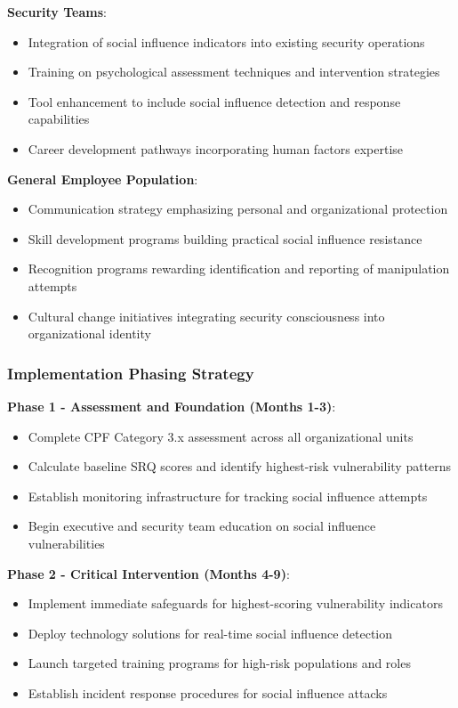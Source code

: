 \documentclass[11pt,a4paper]{article}
\begin{document}
\textbf{Security Teams}:
\begin{itemize}
\item Integration of social influence indicators into existing security operations
\item Training on psychological assessment techniques and intervention strategies
\item Tool enhancement to include social influence detection and response capabilities
\item Career development pathways incorporating human factors expertise
\end{itemize}

\textbf{General Employee Population}:
\begin{itemize}
\item Communication strategy emphasizing personal and organizational protection
\item Skill development programs building practical social influence resistance
\item Recognition programs rewarding identification and reporting of manipulation attempts
\item Cultural change initiatives integrating security consciousness into organizational identity
\end{itemize}

\subsubsection{Implementation Phasing Strategy}

\textbf{Phase 1 - Assessment and Foundation (Months 1-3)}:
\begin{itemize}
\item Complete CPF Category 3.x assessment across all organizational units
\item Calculate baseline SRQ scores and identify highest-risk vulnerability patterns
\item Establish monitoring infrastructure for tracking social influence attempts
\item Begin executive and security team education on social influence vulnerabilities
\end{itemize}

\textbf{Phase 2 - Critical Intervention (Months 4-9)}:
\begin{itemize}
\item Implement immediate safeguards for highest-scoring vulnerability indicators
\item Deploy technology solutions for real-time social influence detection
\item Launch targeted training programs for high-risk populations and roles
\item Establish incident response procedures for social influence attacks
\end{itemize}
\end{document}
